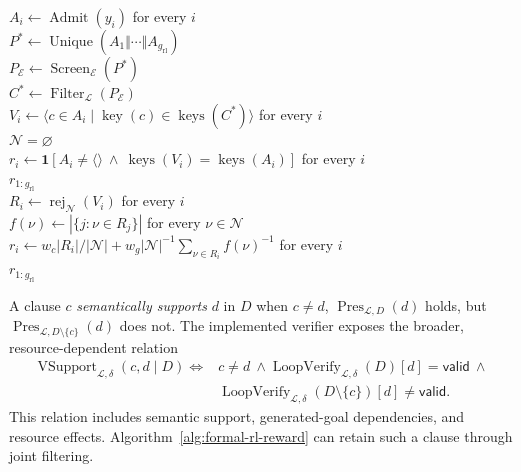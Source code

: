 \begin{algorithm}[H]
\caption{CRAFT reward for one RL group}
\label{alg:formal-rl-reward}
\begin{algorithmic}
\algline \(A_i\leftarrow\operatorname{Admit}(y_i)\) for every \(i\)\\
\algline \(P^*\leftarrow\operatorname{Unique}(A_1\Vert\cdots\Vert
  A_{g_{\mathrm{rl}}})\)\\
\algline \(P_{\mathcal E}\leftarrow\operatorname{Screen}_{\mathcal E}(P^*)\)
  \\
\algline \(C^*\leftarrow\operatorname{Filter}_{\mathcal L}(P_{\mathcal E})\)
  \\
\algline \(V_i\leftarrow\langle c\in A_i\mid\operatorname{key}(c)\in
  \operatorname{keys}(C^*)\rangle\) for every \(i\)\\
\algline {} \(\mathcal N=\varnothing\) \\
\algline \algind \(r_i\leftarrow\mathbf 1[A_i\ne\langle\rangle\ \land\
  \operatorname{keys}(V_i)=\operatorname{keys}(A_i)]\) for every \(i\)\\
\algline \algind \kw{return} \(r_{1:g_{\mathrm{rl}}}\)\\
\algline \(R_i\leftarrow\operatorname{rej}_{\mathcal N}(V_i)\) for every \(i\)\\
\algline \(f(\nu)\leftarrow|\{j:\nu\in R_j\}|\) for every \(\nu\in\mathcal N\)\\
\algline \(r_i\leftarrow w_c|R_i|/|\mathcal N|+
  w_g|\mathcal N|^{-1}\sum_{\nu\in R_i}f(\nu)^{-1}\)
  for every \(i\)\\
\algline {} \(r_{1:g_{\mathrm{rl}}}\)\\
\end{algorithmic}
\end{algorithm}

A clause \(c\) \emph{semantically supports} \(d\) in \(D\) when
\(c\ne d\), \(\operatorname{Pres}_{\mathcal L,D}(d)\) holds, but
\(\operatorname{Pres}_{\mathcal L,D\setminus\{c\}}(d)\) does not.  The
implemented verifier exposes the broader, resource-dependent relation
\begin{equation}
\begin{split}
\operatorname{VSupport}_{\mathcal L,\delta}(c,d\mid D)
\iff{}&c\ne d\ \land
\operatorname{LoopVerify}_{\mathcal L,\delta}(D)[d]=\mathsf{valid}\ \land\\
&\operatorname{LoopVerify}_{\mathcal L,\delta}(D\setminus\{c\})[d]
  \ne\mathsf{valid}.
\end{split}
\label{eq:formal-verifier-support}
\end{equation}
This relation includes semantic support, generated-goal dependencies, and
resource effects.  Algorithm~\ref{alg:formal-rl-reward} can retain such a
clause through joint filtering.

